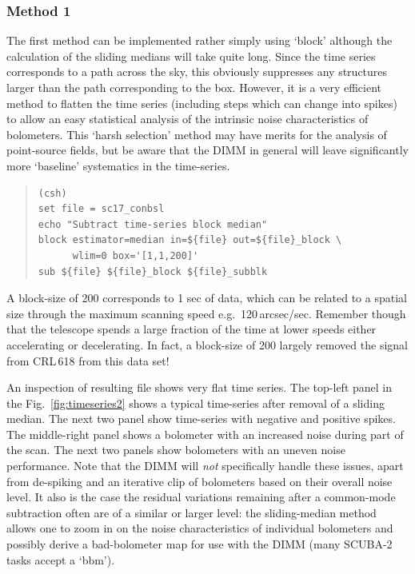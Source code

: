 \documentclass[twoside,11pt]{article}
\newcommand{\xlabel}[1]{}
\renewcommand{\_}{\texttt{\symbol{95}}}
\newenvironment{myquote}{\begin{quote}\begin{small}}{\end{small}\end{quote}}
\begin{document}
\subsubsection{\xlabel{method1}Method 1}
\label{sec:method1}

The first method can be implemented rather simply using `block'
although the calculation of the sliding medians will take quite
long. Since the time series corresponds to a path across the sky, this
obviously suppresses any structures larger than the path corresponding
to the box. However, it is a very efficient method to flatten the time
series (including steps which can change into spikes) to allow an easy
statistical analysis of the intrinsic noise characteristics of
bolometers.  This `harsh selection' method may have merits for the
analysis of point-source fields, but be aware that the DIMM
in general will leave significantly more `baseline' systematics in the
time-series.

\begin{myquote}
\begin{verbatim}
(csh)
set file = sc17_conbsl
echo "Subtract time-series block median"
block estimator=median in=${file} out=${file}_block \
      wlim=0 box='[1,1,200]'
sub ${file} ${file}_block ${file}_subblk
\end{verbatim}
\end{myquote}

A block-size of 200 corresponds to 1 sec of data, which can be related
to a spatial size through the maximum scanning speed
e.g.\ 120\,arcsec/sec. Remember though that the telescope spends a large
fraction of the time at lower speeds either accelerating or
decelerating. In fact, a block-size of 200 largely removed the signal
from CRL\,618 from this data set!

An inspection of resulting file shows very flat time series. The
top-left panel in the Fig.~\ref{fig:timeseries2} shows a typical
time-series after removal of a sliding median. The next two panel show
time-series with negative and positive spikes. The middle-right panel
shows a bolometer with an increased noise during part of the scan. The
next two panels show bolometers with an uneven noise performance. Note
that the DIMM will \textsl{not} specifically handle these
issues, apart from de-spiking and an iterative clip of bolometers
based on their overall noise level.  It also is the case the residual
variations remaining after a common-mode subtraction often are of a
similar or larger level: the sliding-median method allows one to zoom
in on the noise characteristics of individual bolometers and possibly
derive a bad-bolometer map for use with the DIMM (many SCUBA-2
tasks accept a `bbm').
\end{document}
